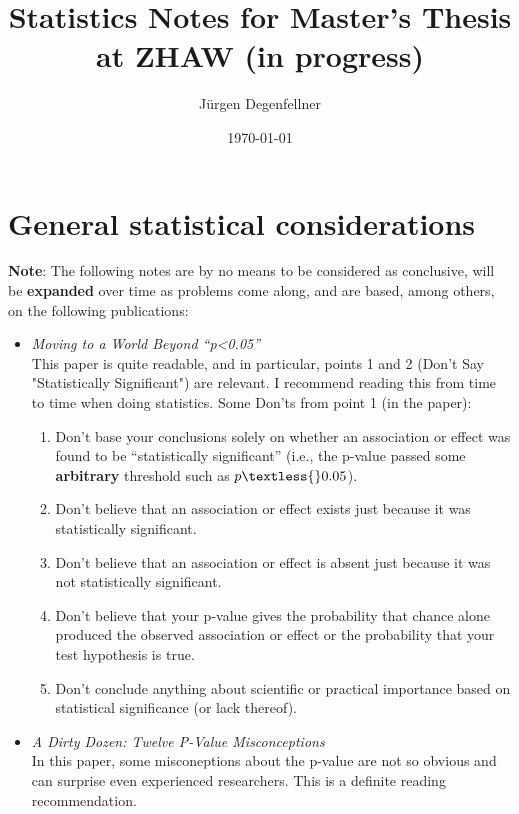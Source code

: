 \documentclass[12pt,a4paper]{article}
\title{Statistics Notes for Master's Thesis at ZHAW (in progress)}
\author{Jürgen Degenfellner}
\date{\today}
\begin{document}
\maketitle

\section{General statistical considerations}

\noindent \textbf{Note}: The following notes are by no means to be considered as conclusive, will be \textbf{expanded} over time as problems come along, and are based, among others, on the following publications:

\begin{itemize}

\item \textit{Moving to a World Beyond “p\textless{}0.05”} \cite{Wasserstein2019}\\
This paper is quite readable, and in particular, points 1 and 2 (Don't Say "Statistically Significant") are relevant. I recommend reading this from time to time when doing statistics. Some Don'ts from point 1 (in the paper):
    \begin{enumerate}
        \item Don’t base your conclusions solely on whether an association or effect was found to be “statistically significant” (i.e., the p-value passed some \textbf{arbitrary} threshold such as \( p \textless{} 0.05 \)).
        \item Don’t believe that an association or effect exists just because it was statistically significant.
        \item Don’t believe that an association or effect is absent just because it was not statistically significant.
        \item Don’t believe that your p-value gives the probability that chance alone produced the observed association or effect or the probability that your test hypothesis is true.
        \item Don’t conclude anything about scientific or practical importance based on statistical significance (or lack thereof).
    \end{enumerate}

\item \textit{A Dirty Dozen: Twelve P-Value Misconceptions} \cite{Goodman2008}\\
In this paper, some misconeptions about the p-value are not so obvious and can surprise even experienced researchers. This is a definite reading recommendation.


\end{itemize}
\end{document}
